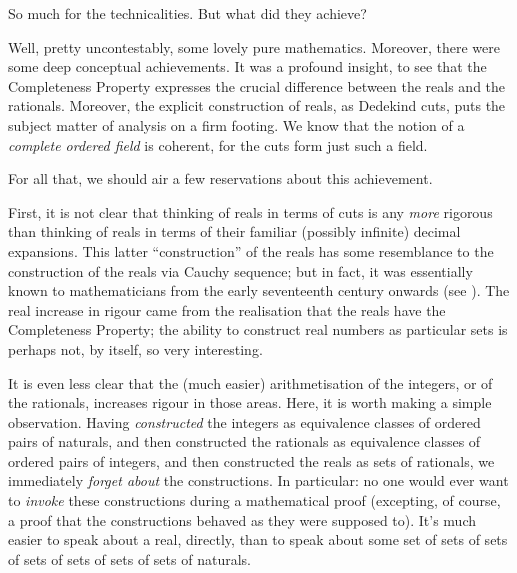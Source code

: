 \documentclass[../../../include/open-logic-section]{subfiles}
\begin{document}

So much for the technicalities. But what did they achieve?

Well, pretty uncontestably, some {lovely} pure mathematics. Moreover,
there were some deep conceptual achievements. It was a profound
insight, to see that the Completeness Property expresses the crucial
difference between the reals and the rationals. Moreover, the explicit
construction of reals, as Dedekind cuts, puts the subject matter of
analysis on a firm footing. We know that the notion of a
\emph{complete ordered field} is coherent, for the cuts form just such
a field. 

For all that, we should air a few reservations about this achievement. 

First, it is not clear that thinking of reals in terms of cuts is any
\emph{more} rigorous than thinking of reals in terms of their familiar
(possibly infinite) decimal expansions. This latter ``construction''
of the reals has some resemblance to the construction of the reals via
Cauchy sequence; but in fact, it was essentially known to
mathematicians from the early seventeenth century onwards (see
). The real increase in rigour came from the
realisation that the reals have the Completeness Property; the ability
to construct real numbers as particular sets is perhaps not, by
itself, so very interesting.

It is even less clear that the (much easier) arithmetisation of the
integers, or of the rationals, increases rigour in those areas. Here,
it is worth making a simple observation. Having \emph{constructed} the
integers as equivalence classes of ordered pairs of naturals, and then
constructed the rationals as equivalence classes of ordered pairs of
integers, and then constructed the reals as sets of rationals, we
immediately \emph{forget about} the constructions. In particular: no
one would ever want to \emph{invoke} these constructions during a
mathematical proof (excepting, of course, a proof that the
constructions behaved as they were supposed to). It's much easier to
speak about a real, directly, than to speak about some set of sets of
sets of sets of sets of sets of sets of naturals. 
%
%
%
	
\end{document}
